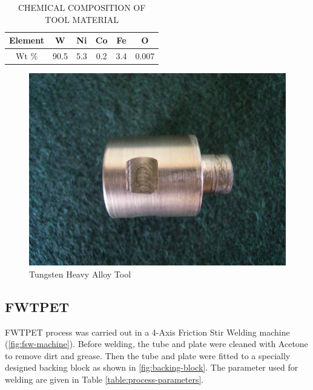 \documentclass[3p]{elsarticle}
\begin{document}
\begin{table}[!htbp]
\caption{CHEMICAL COMPOSITION OF TOOL MATERIAL}
\centering
\begin{tabular}{|c|c|c|c|c|c|}
\hline 
Element & W & Ni & Co & Fe & O \\ 
\hline 
Wt \% & 90.5 & 5.3 & 0.2 & 3.4 & 0.007 \\ 
\hline 
\end{tabular}
\label{table:tool-composition} %
\end{table}

\begin{figure}[H]
\centering
\includegraphics[width=\textwidth]{images/Tool.jpg}
\caption{Tungsten Heavy Alloy Tool}
\label{fig:tool}
\end{figure}

\subsection{FWTPET}
\label{subsec:FWTPET}
FWTPET process was carried out in a 4-Axis Friction Stir Welding machine (\ref{fig:fsw-machine}). Before welding, the tube and plate were cleaned with Acetone to remove dirt and grease. Then the tube and plate were fitted to a specially designed backing block as shown in \ref{fig:backing-block}. The parameter used for welding are given in Table \ref{table:process-parameters}. %
\end{document}

